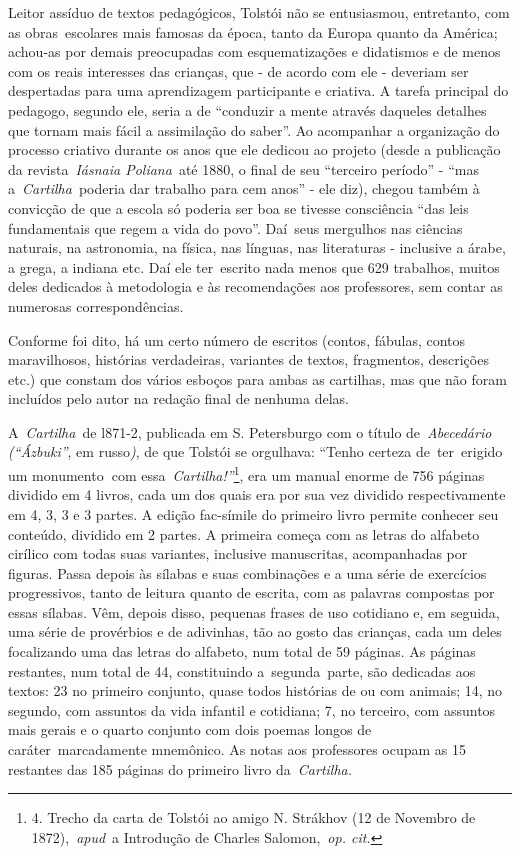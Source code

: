 Leitor assíduo de textos pedagógicos, Tolstói não se entusiasmou,
entretanto, com as obras~escolares mais famosas da época, tanto da
Europa quanto da América; achou-as por demais preocupadas com
esquematizações e didatismos e de menos com os reais interesses das
crianças, que - de acordo com ele - deveriam ser despertadas para uma
aprendizagem participante e criativa. A tarefa principal do pedagogo,
segundo ele, seria a de ``conduzir a mente através daqueles detalhes que
tornam mais fácil a assimilação do saber''. Ao acompanhar a organização
do processo criativo durante os anos que ele dedicou ao projeto (desde a
publicação da revista~\emph{Iásnaia Poliana}~até 1880, o final de seu
``terceiro período'' - ``mas a~\emph{Cartilha}~poderia dar trabalho para
cem anos'' - ele diz), chegou também à convicção de que a escola só
poderia ser boa se tivesse consciência ``das leis fundamentais que regem
a vida do povo''. Daí~seus mergulhos nas ciências naturais, na
astronomia, na física, nas línguas, nas literaturas - inclusive a árabe,
a grega, a indiana etc. Daí ele ter~escrito nada menos que 629
trabalhos, muitos deles dedicados à metodologia e às recomendações aos
professores, sem contar as numerosas correspondências.~~

Conforme foi dito, há um certo número de escritos (contos, fábulas,
contos maravilhosos, histórias verdadeiras, variantes de textos,
fragmentos, descrições etc.) que constam dos vários esboços para ambas
as cartilhas, mas que não foram incluídos pelo autor na redação final de
nenhuma delas.

A~\emph{Cartilha~}de l871-2, publicada em S. Petersburgo com o título
de~\emph{Abecedário (``Ázbuki''}, em russo\emph{)}, de que Tolstói se
orgulhava: ``Tenho certeza de~ter~erigido um monumento\textbf{~}com
essa~\emph{Cartilha!''}\footnote{4. Trecho da carta de Tolstói ao amigo
  N. Strákhov (12 de Novembro de 1872),~\emph{apud}~a Introdução de
  Charles Salomon,~\emph{op. cit.}}, era um manual enorme de 756 páginas
dividido em 4 livros, cada um dos quais era por sua vez dividido
respectivamente em 4, 3, 3 e 3 partes. A edição fac-símile do primeiro
livro permite conhecer seu conteúdo, dividido em 2 partes. A primeira
começa com as letras do alfabeto cirílico com todas suas variantes,
inclusive manuscritas, acompanhadas por figuras. Passa depois às sílabas
e suas combinações e a uma série de exercícios progressivos, tanto de
leitura quanto de escrita, com as palavras compostas por essas sílabas.
Vêm, depois disso, pequenas frases de uso cotidiano e, em seguida, uma
série de provérbios e de adivinhas, tão ao gosto das crianças, cada um
deles focalizando uma das letras do alfabeto, num total de 59 páginas.
As páginas restantes, num total de 44, constituindo a~segunda~parte, são
dedicadas aos textos: 23 no primeiro conjunto, quase todos histórias de
ou com animais; 14, no segundo, com assuntos da vida infantil e
cotidiana; 7, no terceiro, com assuntos mais gerais e o quarto conjunto
com dois poemas longos de caráter~marcadamente mnemônico. As notas aos
professores ocupam as 15 restantes das 185 páginas do primeiro livro
da~\emph{Cartilha.}

